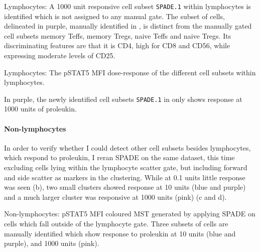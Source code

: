 { Lymphocytes: A 1000 unit responsive cell subset \texttt{SPADE.1} within lymphocytes is identified which is not assigned to any manual gate.  }
{
  The subset of cells, delineated in purple, manually identified in ,
  is distinct from the manually gated cell subsets memory Teffs, memory Tregs, naive Teffs and naive Tregs.
  Its discriminating features are that it is CD4\negative, high for CD8 and CD56, while expressing moderate levels of CD25.
}

{ Lymphocytes: The pSTAT5 MFI dose-response of the different cell subsets within lymphocytes. }
{
    In purple, the newly identified cell subsets \texttt{SPADE.1} in  only shows response at 1000 units of proleukin.

}

\clearpage

\paragraph{Non-lymphocytes}

In order to verify whether I could detect other cell subsets besides lymphocytes, which respond to proleukin,
I reran \gls{SPADE} on the same dataset, this time excluding cells lying within the lymphocyte scatter gate,
but including forward and side scatter as markers in the clustering.
While at 0.1 units little response was seen (b),
two small clusters showed response at 10 units (blue and purple) and a much larger cluster was responsive at 1000 units (pink)
(c and d).

{Non-lymphocytes: pSTAT5 MFI coloured \gls{MST} generated by applying \gls{SPADE} on cells which fall outside of the lymphocyte gate.}
{
  Three subsets of cells are manually identified which show response to proleukin at 10 units (blue and purple),
  and 1000 units (pink).
}
% 

